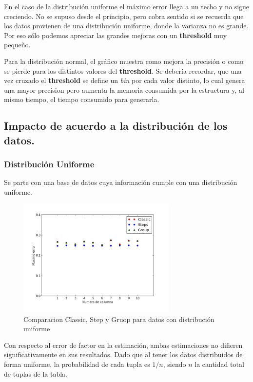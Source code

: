 \documentclass[10pt, a4paper,english,spanish,hidelinks]{article}
\begin{document}
En el caso de la distribución uniforme el máximo error llega a un
techo y no sigue creciendo. No se supuso desde el principio, pero cobra sentido si
se recuerda que los datos provienen de una distribución uniforme, donde la varianza no es
grande. Por eso sólo podemos apreciar las grandes mejoras con un \textbf{threshold} muy pequeño.

Para la distribución normal, el gráfico muestra como mejora la precisión o como se pierde
para los distintos valores del \textbf{threshold}. Se debería recordar, que una vez cruzado el
\textbf{threshold} se define un \textit{bin} por cada valor distinto, lo cual genera una mayor
precision pero aumenta la memoria consumida por la estructura y, al mismo tiempo, el tiempo
consumido para generarla.


\subsection{Impacto de acuerdo a la distribución de los datos.}
\subsubsection{Distribución Uniforme}

Se parte con una base de datos cuya información cumple con una distribución uniforme.

\begin{figure}[h!]
  \centering
  \includegraphics[width=0.7\textwidth]{./imagenes/ejb3_uniforme.png}
  \caption{Comparacion Classic, Step y Gruop para datos con distribución uniforme}
\end{figure}

\newpage
Con respecto al error de factor en la estimación, ambas estimaciones no difieren
significativamente en sus resultados. Dado que al tener los datos distribuidos de forma
uniforme, la probabilidad de cada tupla es $1/n$, siendo $n$ la cantidad total de tuplas de la tabla.
\end{document}
